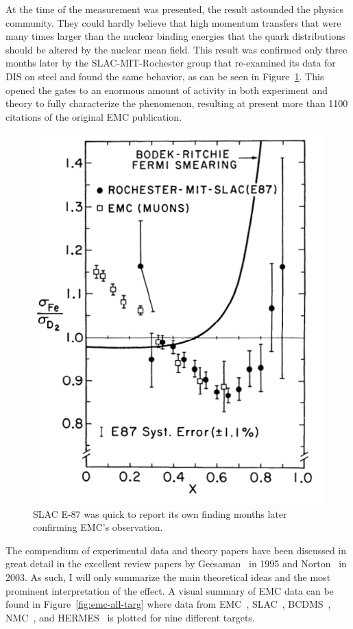 At the time of the measurement was presented, the result astounded the physics community. They could hardly believe that high momentum transfers that were many times larger than the nuclear binding energies that the quark distributions should be altered by the nuclear mean field. This result was confirmed only three months later by the SLAC-MIT-Rochester group that re-examined its data for DIS on steel\cite{PhysRevLett.50.1431} and found the same behavior, as can be seen in Figure~\ref{fig:emc-e87}. This opened the gates to an enormous amount of activity in both experiment and theory to fully characterize the phenomenon, resulting at present more than 1100 citations of the original EMC publication\cite{Aubert:1983xm}. \setlength{\columnsep}{28pt} \begin{figure}
	\centering
	\includegraphics[height=0.35\textheight]{figures/background/SLAC-E87.png}
	\caption{SLAC E-87 was quick to report its own finding months later confirming EMC's observation\cite{PhysRevLett.50.1431}.}
	\vspace{-20pt}
	\label{fig:emc-e87}
\end{figure} The compendium of experimental data and theory papers have been discussed in great detail in the excellent review papers by Geesaman~\cite{Geesaman:1995yd} in 1995 and Norton~\cite{norton:emc-review} in 2003. As such, I will only summarize the main theoretical ideas and the most prominent interpretation of the effect. A visual summary of EMC data can be found in Figure~\ref{fig:emc-all-targ} where data from EMC~\cite{Aubert:1983xm}, SLAC~\cite{Arnold:1983mw, Gomez:1993ri}, BCDMS~\cite{Benvenuti:1987az}, NMC~\cite{Amaudruz:1991nw}, and HERMES~\cite{Ackerstaff:1999ac} is plotted for nine different targets.

